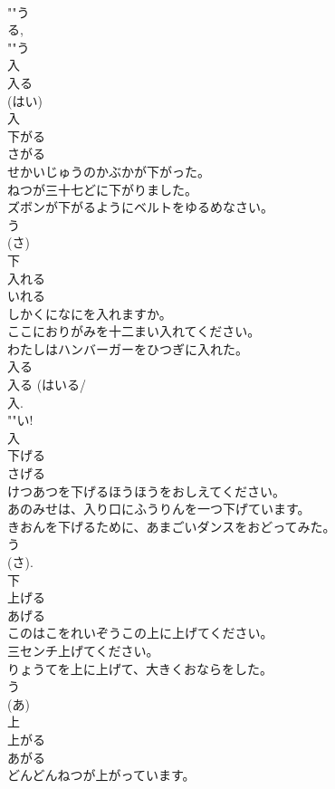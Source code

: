 \documentclass[8pt]{extreport}
\begin{document}
\begin{CJK}{UTF8}{min}
\\	""う
\\	る, 
\\	""う
\\	入 
\\	入る 
\\	(はい) 
\\	入	
\\	下がる	
\\	さがる	
\\	せかいじゅうのかぶかが下がった。	
\\	ねつが三十七どに下がりました。	
\\	ズボンが下がるようにベルトをゆるめなさい。	
\\	う 
\\	(さ) 
\\	下	
\\	入れる	
\\	いれる	
\\	しかくになにを入れますか。	
\\	ここにおりがみを十二まい入れてください。	
\\	わたしはハンバーガーをひつぎに入れた。	
\\	入る 
\\	入る (はいる/
\\	入. 
\\	""い!
\\	入	
\\	下げる	
\\	さげる	
\\	けつあつを下げるほうほうをおしえてください。	
\\	あのみせは、入り口にふうりんを一つ下げています。	
\\	きおんを下げるために、あまごいダンスをおどってみた。	
\\	う 
\\	(さ). 
\\	下	
\\	上げる	
\\	あげる	
\\	このはこをれいぞうこの上に上げてください。	
\\	三センチ上げてください。	
\\	りょうてを上に上げて、大きくおならをした。	
\\	う 
\\	(あ) 
\\	上	
\\	上がる	
\\	あがる	
\\	どんどんねつが上がっています。	

\end{CJK}
\end{document}
